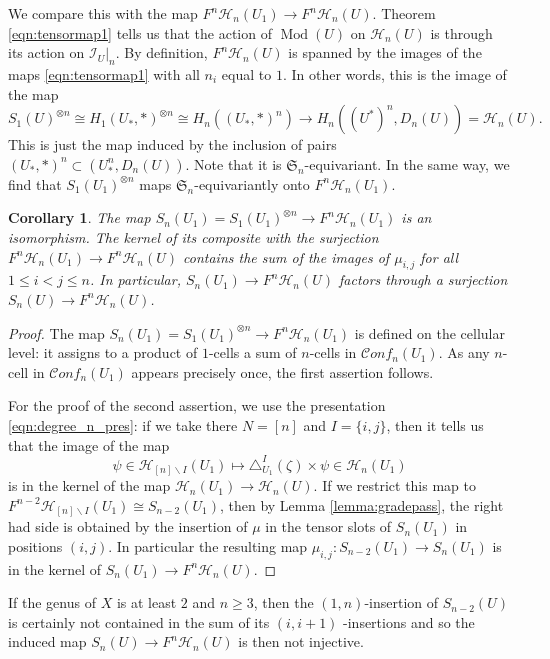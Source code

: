 \documentclass[12pt,letterpaper]{amsart}
\numberwithin{equation}{section}
\def\ssm{\smallsetminus}
\def\tri{\triangle}
\def\Hcal{{\mathcal H}}
\def\Ical{{\mathcal I}}
\def\Sfrak{\mathfrak{S}}
\newcommand\conf{\mathscr{C}\!\mathit{onf}\!}
\newcommand\Mod{\operatorname{Mod}}
\newtheorem{corollary}[theorem]{Corollary}
\theoremstyle{remark}
\begin{document}
We compare this  with the map
$F^n\Hcal_n(U_1)\to F^n\Hcal_n(U)$. Theorem \ref{eqn:tensormap1} tells us  that  the action of $\Mod(U)$ on $\Hcal_n(U)$ is through its action on
$\Ical_U|_n$. By definition, $F^n\Hcal_n(U)$ is spanned by the images of the maps \eqref{eqn:tensormap1} with all $n_i$ equal to $1$. In other words, this is the image of the map 
\begin{equation}\label{eqn:Fnrestriction}
S_1(U)^{\otimes n}\cong H_1(U_*,*)^{\otimes n}\cong  H_n((U_*,*)^n) \to  H_n((U^*)^n, D_n(U))=\Hcal_n(U).
\end{equation}
This is just the map  induced by the inclusion of pairs $(U_*,*)^n\subset (U_*^n, D_n(U))$. Note that it  is $\Sfrak_n$-equivariant. In the same way, we find that $S_1(U_1)^{\otimes n}$ maps $\Sfrak_n$-equivariantly onto $F^n\Hcal_n(U_1)$.

\begin{corollary}\label{cor:}
The map $S_n(U_1)=S_1(U_1)^{\otimes n}\to F^n\Hcal_n(U_1)$ is an isomorphism. The kernel of its composite with the  surjection  
$F^n\Hcal_n(U_1)\to F^n\Hcal_n(U)$ contains 
the sum of the images of $\mu_{i,j}$ for all $1\le i<j\le n$. In particular, $S_n(U_1)\to F^n\Hcal_n(U)$ factors through  a surjection $S_n(U)\to F^n\Hcal_n(U)$.
\end{corollary}
\begin{proof}
The map $S_n(U_1)=S_1(U_1)^{\otimes n}\to F^n\Hcal_n(U_1)$ is defined on the cellular level: it assigns to a product of $1$-cells a sum of $n$-cells in $\conf_n(U_1)$. As any $n$-cell in $\conf_n(U_1)$ appears precisely  once,  the first assertion follows.

For the proof of the second assertion, we  use  the presentation \eqref{eqn:degree_n_pres}: if we take there   $N=[n]$ and $I=\{i,j\}$, then  it tells us  that  the image of the  map 
\[
\psi\in \Hcal_{[n]\ssm I}(U_1)\mapsto \tri^{I}_{U_1}(\zeta)\times\psi\in  \Hcal_n(U_1)
\]
 is in the kernel of  the map $\Hcal_n(U_1)\to \Hcal_n(U)$. If we restrict this map to   $F^{n-2}\Hcal_{[n]\ssm I}(U_1)\cong S_{n-2}(U_1)$, then 
by Lemma \ref{lemma:gradepass}, the right had side is obtained by the insertion of $\mu$ in the tensor slots of $S_n(U_1)$  in positions  $(i,j)$.  In  particular  the resulting map $\mu_{i,j}:S_{n-2}(U_1)\to S_n(U_1)$  is in the kernel of $S_n(U_1)\to F^n\Hcal_n(U)$.
\end{proof}

If the genus of $X$ is at least $2$ and $n\ge 3$, then the  $(1,n)$-insertion of $S_{n-2}(U)$ is certainly not contained in the sum of its $(i, i+1)$ -insertions and so the induced map  $S_n(U)\to F^n\Hcal_n(U)$ is then not injective.
\end{document}

